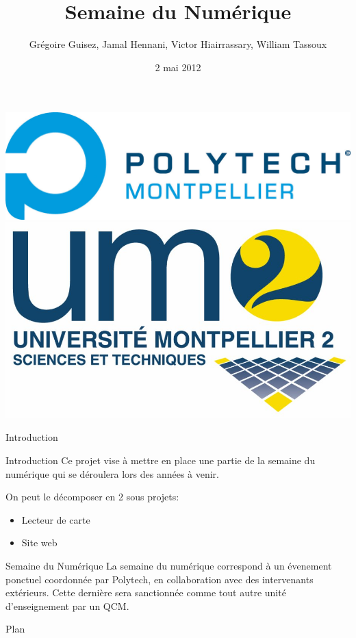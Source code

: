 \documentclass[handout]{beamer}
\title{Semaine du Numérique}
\author[G. Guisez, J. Hennani, V. Hiairrassary, W. Tassoux]{Grégoire Guisez, Jamal Hennani, Victor Hiairrassary, William Tassoux}
\institute{Polytech' Montpellier, Université Montpellier 2}
\date{2 mai 2012}
\begin{document}
\small 



\begin{frame}
    \titlepage

    \includegraphics[scale=0.2]{images/logoPolytech.jpg}
    \hfill
    \hskip8pt
    \includegraphics[scale=0.05]{images/logoUm2.jpg}
\end{frame}


\begin{frame}{Introduction}
    \begin{block}{Introduction}
 		 Ce projet vise à mettre en place une partie de la semaine du numérique qui se déroulera lors des années à venir.

		 On peut le décomposer en 2 sous projets:
		\begin{itemize}
			\item Lecteur de carte
			\item Site web
		\end{itemize}
	\end{block}

	\begin{block}{Semaine du Numérique}
	    La semaine du numérique correspond à un évenement ponctuel coordonnée 
    par Polytech, en collaboration avec des intervenants extérieurs. Cette 
    dernière sera sanctionnée comme tout autre unité d'enseignement par un QCM.
	\end{block}	
\end{frame}


\begin{frame}{Plan}
 	\tableofcontents
\end{frame}




\end{document}
